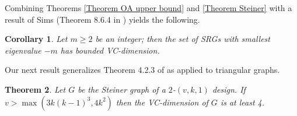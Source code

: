 \documentclass{article}
\newtheorem{thm}{Theorem}
\newtheorem{cor}[thm]{Corollary}
\theoremstyle{definition}
\begin{document}
Combining Theorems \ref{Theorem OA upper bound} and \ref{Theorem Steiner} with a result of Sims (Theorem 8.6.4 in \cite{brouwer2022strongly}) yields the following.

\begin{cor} \label{Corollary -m}
    Let $m\ge 2$ be an integer; then the set of SRGs with smallest eigenvalue $-m$ has bounded VC-dimension.
\end{cor}

Our next result generalizes Theorem 4.2.3 of \cite{benediktsson2021model} as applied to triangular graphs.

\begin{thm} \label{Theorem Steiner lower bound}
    Let $G$ be the Steiner graph of a $2$-$(v,k,1)$ design. If $v>\max(3k(k-1)^3,4k^2)$ then the VC-dimension of $G$ is at least 4.
\end{thm}
\end{document}
